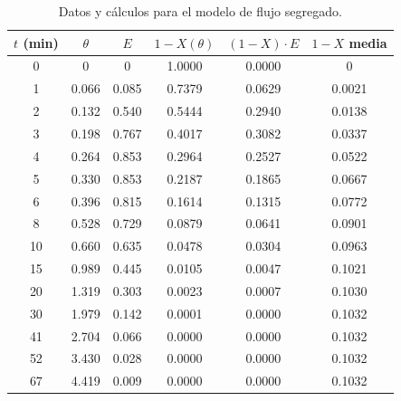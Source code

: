 \begin{table}[htbp]
    \centering
    \caption{Datos y cálculos para el modelo de flujo segregado.}
    \label{tab:flujo_segregado}
    \begin{tabular}{cccccc}
        \toprule
        \textbf{$t$ (min)}    & \textbf{$\theta$} & \textbf{$E$} & \textbf{$1-X(\theta)$} & \textbf{$(1-X)\cdot E$} & \textbf{$1-X$ media} \\ \midrule
        \rowcolor{blue!20} 0  & 0                 & 0            & 1.0000                 & 0.0000                  & 0                    \\
        \rowcolor{red!20} 1   & 0.066             & 0.085        & 0.7379                 & 0.0629                  & 0.0021               \\
        \rowcolor{green!20} 2 & 0.132             & 0.540        & 0.5444                 & 0.2940                  & 0.0138               \\
        3                     & 0.198             & 0.767        & 0.4017                 & 0.3082                  & 0.0337               \\
        4                     & 0.264             & 0.853        & 0.2964                 & 0.2527                  & 0.0522               \\
        5                     & 0.330             & 0.853        & 0.2187                 & 0.1865                  & 0.0667               \\
        6                     & 0.396             & 0.815        & 0.1614                 & 0.1315                  & 0.0772               \\
        8                     & 0.528             & 0.729        & 0.0879                 & 0.0641                  & 0.0901               \\
        10                    & 0.660             & 0.635        & 0.0478                 & 0.0304                  & 0.0963               \\
        15                    & 0.989             & 0.445        & 0.0105                 & 0.0047                  & 0.1021               \\
        20                    & 1.319             & 0.303        & 0.0023                 & 0.0007                  & 0.1030               \\
        30                    & 1.979             & 0.142        & 0.0001                 & 0.0000                  & 0.1032               \\
        41                    & 2.704             & 0.066        & 0.0000                 & 0.0000                  & 0.1032               \\
        52                    & 3.430             & 0.028        & 0.0000                 & 0.0000                  & 0.1032               \\
        67                    & 4.419             & 0.009        & 0.0000                 & 0.0000                  & 0.1032               \\ \bottomrule
    \end{tabular}
\end{table}
